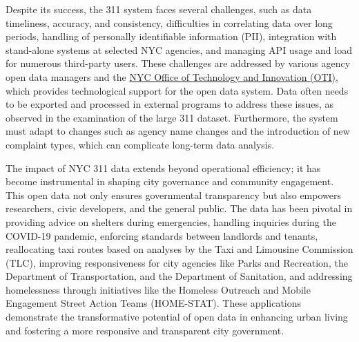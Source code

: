 \documentclass[12pt, titlepage]{article}
\newcommand{\jy}[1]{\textcolor{cyan}{JY: (#1)}}
\begin{document}
Despite its success, the 311 system faces several challenges, such as
data timeliness, accuracy, and consistency, difficulties in
correlating data over long periods, handling of personally
identifiable information (PII), integration with stand-alone systems
at selected NYC agencies, and managing API usage and load for numerous
third-party users. These challenges are addressed by various agency
open data managers and the
\href{https://www.nyc.gov/content/oti/pages/}{NYC Office of Technology
  and Innovation (OTI)}, which provides technological support for the
open data system. Data often needs to be exported and processed in
external programs to address these issues, as observed in the
examination of the large 311 dataset. Furthermore, the system must
adapt to changes such as agency name changes and the introduction of
new complaint types, which can complicate long-term data analysis.


The impact of NYC 311 data extends beyond operational efficiency; it
has become instrumental in shaping city governance and community
engagement. This open data not only ensures governmental transparency
but also empowers researchers, civic developers, and the general
public. The data has been pivotal in providing advice on shelters
during emergencies, handling inquiries during the COVID-19 pandemic,
enforcing standards between landlords and tenants, reallocating taxi
routes based on analyses by the Taxi and Limousine Commission (TLC),
improving responsiveness for city agencies like Parks and Recreation,
the Department of Transportation, and the Department of Sanitation,
and addressing homelessness through initiatives like the Homeless
Outreach and Mobile Engagement Street Action Teams (HOME-STAT). These
applications demonstrate the transformative potential of open data in
enhancing urban living and fostering a more responsive and transparent
city government.

\end{document}
